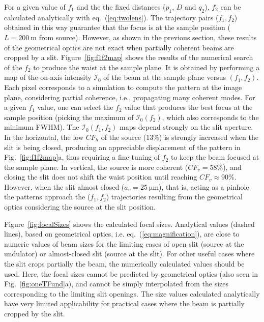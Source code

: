 \documentclass[doublecol]{epl2}
\newcommand{\inred}[1]{{\color{black}#1}} %
\begin{document}
For a given value of $f_1$ and the the fixed distances ($p_1$, $D$ and $q_2$), $f_2$ can be calculated analytically with \inred{eq.}~(\ref{eq:twolens}). The trajectory pairs ($f_1,f_2$) obtained in this way guarantee that the focus is at the sample position ($L=\SI{200}{\meter}$ from source). However, as shown in the previous section, these results of the geometrical optics are not exact when partially coherent beams are cropped by a slit. 
Figure~\ref{fig:f1f2map} shows the results of the numerical search of the $f_2$ to produce the waist at the sample plane. It is obtained by performing a map of the on-axis intensity $\mathcal{I}_0$ of the beam at the sample plane versus $(f_1,f_2)$. Each pixel corresponds to a simulation to compute the pattern at the image plane, considering partial coherence, i.e., propagating many coherent modes. For a given $f_1$ value, one can select the $f_2$ value that produces the best focus at the sample position (picking the maximum of $\mathcal{I}_0(f_2)$, which also corresponds to the minimum FWHM). 
The $\mathcal{I}_0(f_1,f_2)$ maps depend strongly on the slit aperture. In the horizontal, the low $CF_h$ of the source (13\%) is strongly increased when the slit is being closed, producing \inred{an} appreciable displacement of the pattern in Fig.~\ref{fig:f1f2map}a, thus requiring a fine tuning of $f_2$ to keep the beam focused at the sample plane. In vertical, the source is more coherent ($CF_v=58\%$)\inred{,} and closing the slit does not 
shift the waist position until reaching $CF_v\approx90\%$. However, when the slit almost closed ($a_v=\SI{25}{\micro\meter}$), that is, acting as a pinhole the patterns approach the ($f_1,f_2$) trajectories resulting from the geometrical optics considering the source at the slit position.

Figure~\ref{fig:focalSizes} shows the calculated focal sizes. Analytical values (dashed lines), based on geometrical optics, i.e. \inred{eq.}~(\ref{eq:magnification}), are close to numeric values of beam sizes for the limiting cases of open slit (source at the undulator) or almost-closed slit (source at the slit). For other useful cases where the slit crops partially the beam, the numerically calculated values should be used. Here, the focal sizes cannot be predicted by geometrical optics (also seen in Fig.~\ref{fig:oneTFund}a), and cannot be simply interpolated from the sizes corresponding to the limiting slit openings. The size values calculated analytically have very limited applicability for practical cases \inred{where} the beam is partially cropped by the slit. 
\end{document}
